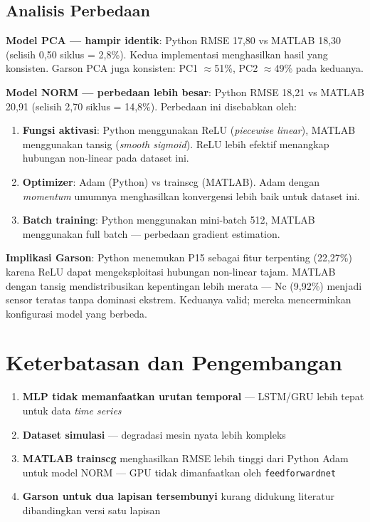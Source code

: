 \documentclass[11pt,a4paper]{article}
\begin{document}
\subsection{Analisis Perbedaan}

\textbf{Model PCA --- hampir identik}:
Python RMSE 17,80 vs MATLAB 18,30 (selisih 0,50 siklus = 2,8\%).
Kedua implementasi menghasilkan hasil yang konsisten.
Garson PCA juga konsisten: PC1 $\approx$51\%, PC2 $\approx$49\%
pada keduanya.

\textbf{Model NORM --- perbedaan lebih besar}:
Python RMSE 18,21 vs MATLAB 20,91 (selisih 2,70 siklus = 14,8\%).
Perbedaan ini disebabkan oleh:
\begin{enumerate}[noitemsep]
  \item \textbf{Fungsi aktivasi}: Python menggunakan ReLU
    (\textit{piecewise linear}), MATLAB menggunakan tansig
    (\textit{smooth sigmoid}). ReLU lebih efektif menangkap
    hubungan non-linear pada dataset ini.
  \item \textbf{Optimizer}: Adam (Python) vs trainscg (MATLAB).
    Adam dengan \textit{momentum} umumnya menghasilkan konvergensi
    lebih baik untuk dataset ini.
  \item \textbf{Batch training}: Python menggunakan mini-batch 512,
    MATLAB menggunakan full batch --- perbedaan gradient estimation.
\end{enumerate}

\textbf{Implikasi Garson}:
Python menemukan P15 sebagai fitur terpenting (22,27\%) karena
ReLU dapat mengeksploitasi hubungan non-linear tajam. MATLAB
dengan tansig mendistribusikan kepentingan lebih merata ---
Nc (9,92\%) menjadi sensor teratas tanpa dominasi ekstrem.
Keduanya valid; mereka mencerminkan konfigurasi model yang berbeda.

\section{Keterbatasan dan Pengembangan}

\begin{enumerate}[noitemsep]
  \item \textbf{MLP tidak memanfaatkan urutan temporal} ---
    LSTM/GRU lebih tepat untuk data \textit{time series}
  \item \textbf{Dataset simulasi} --- degradasi mesin nyata lebih kompleks
  \item \textbf{MATLAB trainscg} menghasilkan RMSE lebih tinggi dari
    Python Adam untuk model NORM --- GPU tidak dimanfaatkan oleh
    \texttt{feedforwardnet}
  \item \textbf{Garson untuk dua lapisan tersembunyi} kurang didukung
    literatur dibandingkan versi satu lapisan
\end{enumerate}
\end{document}
